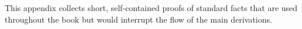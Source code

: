 \chapter{\texorpdfstring{}{Miscellaneous Proofs}}\label{app:misc-proofs}

\begin{nknote}
This appendix collects short, self-contained proofs of standard facts that are used throughout the book but would interrupt the flow of the main derivations.
\end{nknote}

\section{\texorpdfstring{}{Two Perspectives on the Divergence Theorem}}\label{app-sec:divergence-thm}

